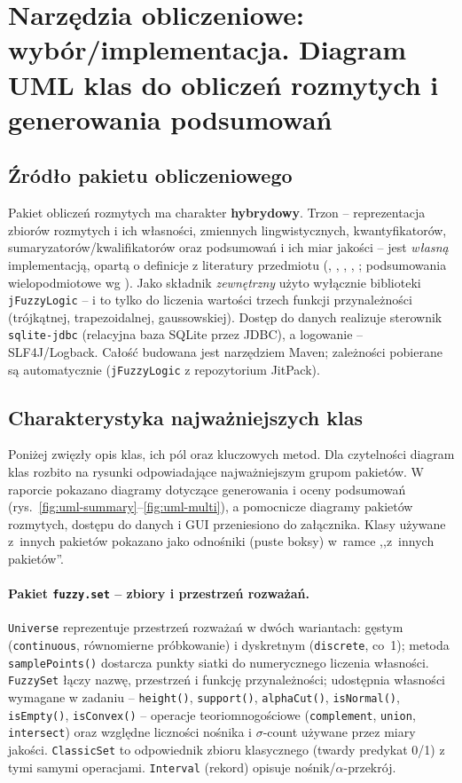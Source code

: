 \documentclass{article}
\begin{document}
\section{Narzędzia obliczeniowe: wybór/implementacja. Diagram UML klas do obliczeń rozmytych i generowania podsumowań}

\subsection{Źródło pakietu obliczeniowego}
Pakiet obliczeń rozmytych ma charakter \textbf{hybrydowy}. Trzon -- reprezentacja
zbiorów rozmytych i ich własności, zmiennych lingwistycznych, kwantyfikatorów,
sumaryzatorów/kwalifikatorów oraz podsumowań i ich miar jakości -- jest
\emph{własną} implementacją, opartą o definicje z literatury przedmiotu
(\cite{zadeh75}, \cite{zadeh83}, \cite{yager82}, \cite{kacprzyk-yager01},
\cite{niewiadomski08}; podsumowania wielopodmiotowe wg \cite{superson14}).
Jako składnik \emph{zewnętrzny} użyto wyłącznie biblioteki \texttt{jFuzzyLogic}
\cite{jfuzzylogic} -- i to tylko do liczenia wartości trzech funkcji
przynależności (trójkątnej, trapezoidalnej, gaussowskiej). Dostęp do danych
realizuje sterownik \texttt{sqlite-jdbc} (relacyjna baza SQLite przez JDBC),
a logowanie -- SLF4J/Logback. Całość budowana jest narzędziem Maven; zależności
pobierane są automatycznie (\texttt{jFuzzyLogic} z repozytorium JitPack).


\subsection{Charakterystyka najważniejszych klas}
Poniżej zwięzły opis klas, ich pól oraz kluczowych metod. Dla czytelności
diagram klas rozbito na rysunki odpowiadające najważniejszym grupom pakietów.
W raporcie pokazano diagramy dotyczące generowania i oceny podsumowań
(rys.~\ref{fig:uml-summary}--\ref{fig:uml-multi}), a pomocnicze diagramy
pakietów rozmytych, dostępu do danych i GUI przeniesiono do załącznika.
Klasy używane z~innych pakietów pokazano jako odnośniki (puste boksy)
w~ramce ,,z~innych pakietów''.

\paragraph{Pakiet \texttt{fuzzy.set} -- zbiory i przestrzeń rozważań.}
\texttt{Universe} reprezentuje przestrzeń rozważań w dwóch wariantach: gęstym
(\texttt{continuous}, równomierne próbkowanie) i dyskretnym (\texttt{discrete},
co~1); metoda \texttt{samplePoints()} dostarcza punkty siatki do numerycznego
liczenia własności. \texttt{FuzzySet} łączy nazwę, przestrzeń i funkcję
przynależności; udostępnia własności wymagane w zadaniu -- \texttt{height()},
\texttt{support()}, \texttt{alphaCut()}, \texttt{isNormal()}, \texttt{isEmpty()},
\texttt{isConvex()} -- operacje teoriomnogościowe (\texttt{complement},
\texttt{union}, \texttt{intersect}) oraz względne liczności nośnika i $\sigma$-count
używane przez miary jakości. \texttt{ClassicSet} to odpowiednik zbioru klasycznego
(twardy predykat 0/1) z tymi samymi operacjami. \texttt{Interval} (rekord)
opisuje nośnik/$\alpha$-przekrój.
\end{document}
